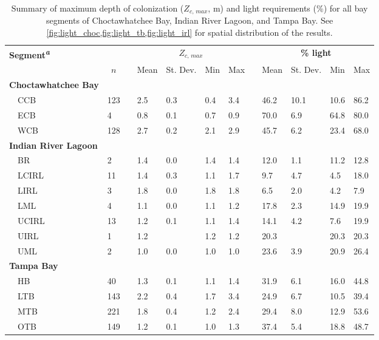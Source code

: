 \documentclass[letterpaper,12pt,oneside]{article}\usepackage[]{graphicx}\usepackage[]{color}
\begin{document}
\begin{table}[!tbp]
{\small
\caption{Summary of maximum depth of colonization ($Z_{c,\,max}$, m) and light requirements (\%) for all bay segments of Choctawhatchee Bay, Indian River Lagoon, and Tampa Bay.  See \cref{fig:light_choc,fig:light_tb,fig:light_irl} for spatial distribution of the results.\label{tab:light_summ}} 
\begin{center}
\begin{tabular}{llcllllcllll}
\hline\hline
\multicolumn{1}{l}{\bfseries Segment\textsuperscript{\textit{a}}}&\multicolumn{1}{c}{\bfseries }&\multicolumn{1}{c}{\bfseries }&\multicolumn{4}{c}{\bfseries {\bf $Z_{c,\,max}$}}&\multicolumn{1}{c}{\bfseries }&\multicolumn{4}{c}{\bfseries \% light}\tabularnewline
\cline{4-7} \cline{9-12}
\multicolumn{1}{l}{}&\multicolumn{1}{c}{$n$}&\multicolumn{1}{c}{}&\multicolumn{1}{c}{Mean}&\multicolumn{1}{c}{St. Dev.}&\multicolumn{1}{c}{Min}&\multicolumn{1}{c}{Max}&\multicolumn{1}{c}{}&\multicolumn{1}{c}{Mean}&\multicolumn{1}{c}{St. Dev.}&\multicolumn{1}{c}{Min}&\multicolumn{1}{c}{Max}\tabularnewline
\hline
{\bfseries Choctawhatchee Bay}&&&&&&&&&&&\tabularnewline
~~CCB&123&&2.5&0.3&0.4&3.4&&46.2&10.1&10.6&86.2\tabularnewline
~~ECB&4&&0.8&0.1&0.7&0.9&&70.0& 6.9&64.8&80.0\tabularnewline
~~WCB&128&&2.7&0.2&2.1&2.9&&45.7& 6.2&23.4&68.0\tabularnewline
\hline
{\bfseries Indian River Lagoon}&&&&&&&&&&&\tabularnewline
~~BR&2&&1.4&0.0&1.4&1.4&&12.0& 1.1&11.2&12.8\tabularnewline
~~LCIRL&11&&1.4&0.3&1.1&1.7&& 9.7& 4.7& 4.5&18.0\tabularnewline
~~LIRL&3&&1.8&0.0&1.8&1.8&& 6.5& 2.0& 4.2& 7.9\tabularnewline
~~LML&4&&1.1&0.0&1.1&1.2&&17.8& 2.3&14.9&19.9\tabularnewline
~~UCIRL&13&&1.2&0.1&1.1&1.4&&14.1& 4.2& 7.6&19.9\tabularnewline
~~UIRL&1&&1.2& &1.2&1.2&&20.3& &20.3&20.3\tabularnewline
~~UML&2&&1.0&0.0&1.0&1.0&&23.6& 3.9&20.9&26.4\tabularnewline
\hline
{\bfseries Tampa Bay}&&&&&&&&&&&\tabularnewline
~~HB&40&&1.3&0.1&1.1&1.4&&31.9& 6.1&16.0&44.8\tabularnewline
~~LTB&143&&2.2&0.4&1.7&3.4&&24.9& 6.7&10.5&39.4\tabularnewline
~~MTB&221&&1.8&0.4&1.2&2.4&&29.4& 8.0&12.9&53.6\tabularnewline
~~OTB&149&&1.2&0.1&1.0&1.3&&37.4& 5.4&18.8&48.7\tabularnewline
\hline
\end{tabular}\end{center}}


\end{table}
\end{document}
